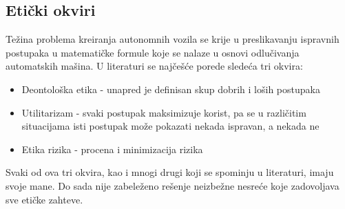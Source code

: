 \documentclass[a4paper]{article}
\begin{document}
\subsection{Etički okviri}
\label{subsec:Etički okviri}
Težina problema kreiranja autonomnih vozila se krije u preslikavanju ispravnih postupaka u matematičke formule koje se nalaze u osnovi odlučivanja automatskih mašina. U literaturi se najčešće porede sledeća tri okvira:
\begin{itemize}
 \item {Deontološka etika - unapred je definisan skup dobrih i loših postupaka}
 \item {Utilitarizam - svaki postupak maksimizuje korist, pa se u različitim              situacijama isti postupak može pokazati nekada ispravan, a nekada ne }
 \item {Etika rizika - procena i minimizacija rizika}
\end{itemize}
Svaki od ova tri okvira, kao i mnogi drugi koji se spominju u literaturi, imaju svoje mane. Do sada nije zabeleženo rešenje neizbežne nesreće koje zadovoljava sve etičke zahteve. \cite{trolley_problem}
\end{document}
